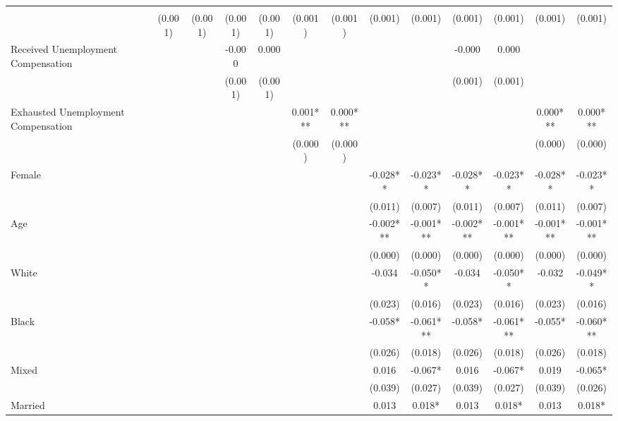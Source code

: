 \documentclass[
]{article}
\begin{document}
\begin{table}[t]
\begin{tabular*}{\linewidth}{@{\extracolsep{\fill}}lcccccccccccc}
{\cellcolor[HTML]{ADD8E6}{Unemployment Duration (Months)}} & {\cellcolor[HTML]{ADD8E6}{-0.007***}} & {\cellcolor[HTML]{ADD8E6}{-0.006***}} & {\cellcolor[HTML]{ADD8E6}{-0.007***}} & {\cellcolor[HTML]{ADD8E6}{-0.006***}} & {\cellcolor[HTML]{ADD8E6}{-0.005***}} & {\cellcolor[HTML]{ADD8E6}{-0.004***}} & {\cellcolor[HTML]{ADD8E6}{-0.006***}} & {\cellcolor[HTML]{ADD8E6}{-0.006***}} & {\cellcolor[HTML]{ADD8E6}{-0.006***}} & {\cellcolor[HTML]{ADD8E6}{-0.006***}} & {\cellcolor[HTML]{ADD8E6}{-0.005***}} & {\cellcolor[HTML]{ADD8E6}{-0.004***}} \\ 
 & (0.001) & (0.001) & (0.001) & (0.001) & (0.001) & (0.001) & (0.001) & (0.001) & (0.001) & (0.001) & (0.001) & (0.001) \\ 
Received Unemployment Compensation &  &  & -0.000 & 0.000 &  &  &  &  & -0.000 & 0.000 &  &  \\ 
 &  &  & (0.001) & (0.001) &  &  &  &  & (0.001) & (0.001) &  &  \\ 
Exhausted Unemployment Compensation &  &  &  &  & 0.001*** & 0.000*** &  &  &  &  & 0.000*** & 0.000*** \\ 
 &  &  &  &  & (0.000) & (0.000) &  &  &  &  & (0.000) & (0.000) \\ 
Female &  &  &  &  &  &  & -0.028** & -0.023** & -0.028** & -0.023** & -0.028** & -0.023** \\ 
 &  &  &  &  &  &  & (0.011) & (0.007) & (0.011) & (0.007) & (0.011) & (0.007) \\ 
Age &  &  &  &  &  &  & -0.002*** & -0.001*** & -0.002*** & -0.001*** & -0.001*** & -0.001*** \\ 
 &  &  &  &  &  &  & (0.000) & (0.000) & (0.000) & (0.000) & (0.000) & (0.000) \\ 
White &  &  &  &  &  &  & -0.034 & -0.050** & -0.034 & -0.050** & -0.032 & -0.049** \\ 
 &  &  &  &  &  &  & (0.023) & (0.016) & (0.023) & (0.016) & (0.023) & (0.016) \\ 
Black &  &  &  &  &  &  & -0.058* & -0.061*** & -0.058* & -0.061*** & -0.055* & -0.060*** \\ 
 &  &  &  &  &  &  & (0.026) & (0.018) & (0.026) & (0.018) & (0.026) & (0.018) \\ 
Mixed &  &  &  &  &  &  & 0.016 & -0.067* & 0.016 & -0.067* & 0.019 & -0.065* \\ 
 &  &  &  &  &  &  & (0.039) & (0.027) & (0.039) & (0.027) & (0.039) & (0.026) \\ 
Married &  &  &  &  &  &  & 0.013 & 0.018* & 0.013 & 0.018* & 0.013 & 0.018* \\ 

\end{tabular*}
\end{table}
\end{document}
